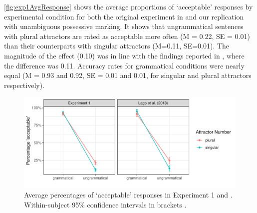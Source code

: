 \documentclass[doc,a4paper,man,natbib,floatsintext,noextraspace]{apa6}\usepackage[]{graphicx}\usepackage[]{color}
\makeatletter
\def\maxwidth{ %
  \ifdim\Gin@nat@width>\linewidth
    \linewidth
  \else
    \Gin@nat@width
  \fi
}
\newenvironment{knitrout}{}{} %
\makeatother
\begin{document}
\autoref{fig:exp1AvgResponse} shows the average proportions of ‘acceptable’ responses by experimental condition for both the original experiment in \citet{LagoEtAl:2018} and our replication with unambiguous possessive marking. 
%
It shows that ungrammatical sentences with plural attractors are rated as acceptable more often
(M = 0.22, 
SE = 0.01) 
than their counterparts with singular attractors 
(M=0.11, 
SE=0.01).
%
%
The magnitude of the effect (0.10) was in line with the findings reported in \citet{LagoEtAl:2018}, where the difference was 0.11.
% 
Accuracy rates for grammatical conditions were nearly equal
%
(M = 0.93 and 0.92, SE = 0.01 and 0.01, for singular and plural attractors respectively). 


\begin{knitrout}
\color{fgcolor}\begin{figure}

{\centering \includegraphics[width=\maxwidth]{figure/exp1AvgResponse-1} 

}

\caption{Average percentages of `acceptable' responses in Experiment 1 and \citet{LagoEtAl:2018}. Within-subject 95\% confidence intervals in brackets \cite{Cousineau:2005,Morey:2008}.}\label{fig:exp1AvgResponse}
\end{figure}


\end{knitrout}
\end{document}
